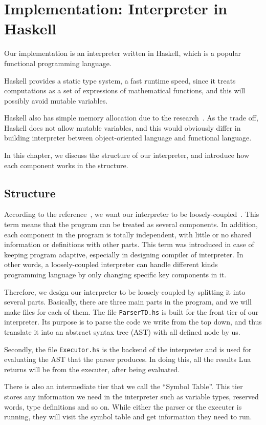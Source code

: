 \chapter{Implementation: Interpreter in Haskell}
Our implementation is an interpreter written in Haskell, which is a popular functional  programming language. 

Haskell provides a static type system, a fast runtime speed, since it treats computations as a set of expressions of mathematical functions,  and this will possibly avoid mutable variables. 

Haskell also has simple memory allocation due to the research~\cite{PIH}. As the trade off, Haskell does not allow mutable variables, and this would obviously differ in building interpreter between object-oriented language and functional language.

In this chapter, we discuss the structure of our interpreter, and introduce how each component works in the structure.

\section{Structure}
According to the reference~\cite{WCAI}, we want our interpreter to be loosely-coupled~\cite{looseC}. This term means that the program can be treated as several components. In addition, each component in the program is totally independent, with little or no shared information or definitions with other parts. This term was introduced in case of keeping program adaptive, especially in designing compiler of interpreter. In other words, a loosely-coupled interpreter can handle different kinds programming language by only changing specific key components in it.

Therefore, we design our interpreter to be loosely-coupled by splitting it into several parts. Basically, there are three main parts in the program, and we will make files for each of them. The file {\tt ParserTD.hs} is built for the front tier of our interpreter. Its purpose is to parse the code we write from the top down, and thus translate it into an
abstract syntax tree (AST) with all defined node by us. 

Secondly, the file {\tt Executor.hs} is the backend of the interpreter and is used for evaluating the AST that the parser produces. In doing this, all the results Lua returns will be from the executer, after being evaluated. 

There is also an intermediate tier that we call the ``Symbol Table''. This tier stores any information we need in the interpreter such as variable types, reserved words, type definitions and so on. While either the parser or the executer is running, they will visit the symbol table and get information they need to run. 

